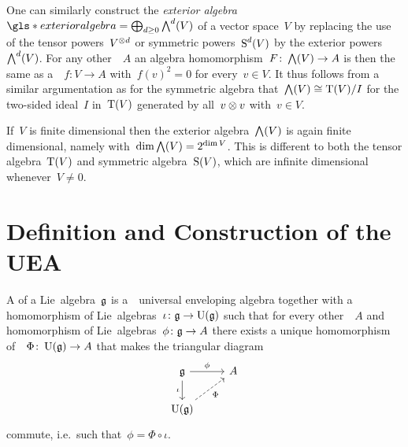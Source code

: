 \begin{remark}  %
  One can similarly construct the \emph{exterior algebra}~$\gls*{exterior algebra} = \bigoplus_{d \geq 0} \Exterior^d(V)$ of a vector space~$V$ by replacing the use of the tensor powers~$V^{\otimes d}$ or symmetric powers~$\operatorname{S}^d(V)$ by the exterior powers~$\bigwedge^d(V)$.
  For any other~{\algebra{$\kf$}}~$A$ an algebra homomorphism~$F \colon \bigwedge(V) \to A$ is then the same as a~{\linear{$\kf$}}~$f \colon V \to A$ with~$f(v)^2 = 0$ for every~$v \in V$.
  It thus follows from a similar argumentation as for the symmetric algebra that~$\bigwedge(V) \cong \operatorname{T}(V)/I$ for the two-sided ideal~$I$ in~$\operatorname{T}(V)$ generated by all~$v \otimes v$ with~$v \in V$.
  
  
  If~$V$ is finite dimensional then the exterior algebra~$\bigwedge(V)$ is again finite dimensional, namely with~$\dim \bigwedge(V) = 2^{\dim V}$.
  This is different to both the tensor algebra~$\operatorname{T}(V)$ and symmetric algebra~$\operatorname{S}(V)$, which are infinite dimensional whenever~$V \neq 0$.
\end{remark}






\section{Definition and Construction of the UEA}


\begin{definition}
  A  of a Lie~algebra~$\mathfrak{g}$ is a~\algebra{$\kf$}~\gls*{universal enveloping algebra} together with a homomorphism of Lie~algebras~$\iota \colon \mathfrak{g} \to \operatorname{U}(\mathfrak{g})$ such that for every other~{\algebra{$\kf$}}~$A$ and homomorphism of Lie~algebras~$\phi \colon \mathfrak{g} \to A$ there exists a unique homomorphism of~\algebras{$\kf$}~$\Phi \colon \operatorname{U}(\mathfrak{g}) \to A$ that makes the triangular diagram
  \[
    \begin{tikzcd}
      \glie
      \arrow{r}[above]{\phi}
      \arrow{d}[left]{\iota}
      &
      A
      \\
      \Univ(\glie)
      \arrow[dashed]{ur}[below right]{\Phi}
      &
      {}
    \end{tikzcd}
  \]
  commute, i.e.\ such that~$\phi = \Phi \circ \iota$.
\end{definition}


